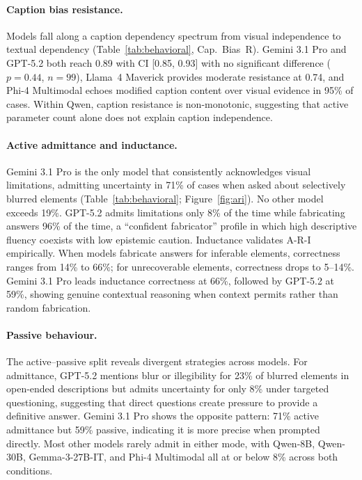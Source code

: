 \paragraph{Caption bias resistance.}
Models fall along a caption dependency spectrum from visual independence to textual dependency (Table~\ref{tab:behavioral}, Cap.\ Bias~R). Gemini 3.1 Pro and GPT-5.2 both reach 0.89 with CI [0.85, 0.93] with no significant difference ($p = 0.44$, $n = 99$), Llama~4 Maverick provides moderate resistance at 0.74, and Phi-4 Multimodal echoes modified caption content over visual evidence in 95\% of cases. Within Qwen, caption resistance is non-monotonic, suggesting that active parameter count alone does not explain caption independence.

\paragraph{Active admittance and inductance.}
Gemini 3.1 Pro is the only model that consistently acknowledges visual limitations, admitting uncertainty in 71\% of cases when asked about selectively blurred elements (Table~\ref{tab:behavioral}; Figure~\ref{fig:ari}). No other model exceeds 19\%. GPT-5.2 admits limitations only 8\% of the time while fabricating answers 96\% of the time, a ``confident fabricator'' profile in which high descriptive fluency coexists with low epistemic caution. Inductance validates A-R-I empirically. When models fabricate answers for inferable elements, correctness ranges from 14\% to 66\%; for unrecoverable elements, correctness drops to 5--14\%. Gemini 3.1 Pro leads inductance correctness at 66\%, followed by GPT-5.2 at 59\%, showing genuine contextual reasoning when context permits rather than random fabrication.

\paragraph{Passive behaviour.}
The active--passive split reveals divergent strategies across models. For admittance, GPT-5.2 mentions blur or illegibility for 23\% of blurred elements in open-ended descriptions but admits uncertainty for only 8\% under targeted questioning, suggesting that direct questions create pressure to provide a definitive answer. Gemini 3.1 Pro shows the opposite pattern: 71\% active admittance but 59\% passive, indicating it is more precise when prompted directly. Most other models rarely admit in either mode, with Qwen-8B, Qwen-30B, Gemma-3-27B-IT, and Phi-4 Multimodal all at or below 8\% across both conditions.

